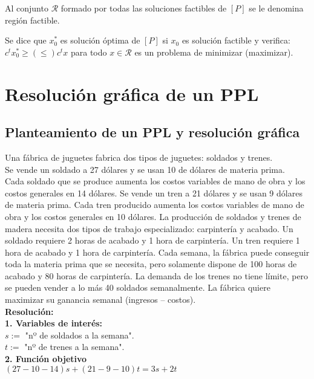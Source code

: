 \documentclass[11pt,fleqn]{book} %
\begin{document}
\begin{definition}
  Al conjunto $\mathcal{R}$ formado por todas las soluciones factibles de $[P]$ se le denomina región factible.
\end{definition}
\begin{definition}
  Se dice que $x_0^*$ es solución óptima de $[P]$ si $x_0$ es solución factible y verifica: \\
  $c^t x_0^* \geq (\leq) c^t x$ para todo $x \in \mathcal{R}$ es un problema de minimizar (maximizar).
\end{definition}
\section{Resolución gráfica de un PPL}
\subsection*{Planteamiento de un PPL y resolución gráfica}
Una fábrica de juguetes fabrica dos tipos de juguetes: soldados y trenes. \\
Se vende un soldado a 27 dólares y se usan 10 de dólares de materia prima. \\
Cada soldado que se produce aumenta los costos variables de mano de obra y los costos generales  en  14  dólares.  Se  vende  un  tren  a  21  dólares  y  se  usan  9  dólares  de materia prima. Cada  tren producido aumenta los costos variables de mano de obra y los costos generales en 10 dólares. La producción de soldados y trenes de madera necesita  dos  tipos  de  trabajo  especializado:  carpintería  y  acabado.  Un  soldado requiere  2  horas  de  acabado  y  1  hora  de  carpintería.  Un  tren  requiere  1  hora  de acabado  y  1  hora  de carpintería.  Cada  semana,  la  fábrica puede  conseguir  toda la materia prima que se necesita, pero solamente dispone de 100 horas de acabado y 80 horas de carpintería. La demanda de los trenes no tiene límite, pero se pueden vender  a  lo  más  40  soldados  semanalmente.  La  fábrica  quiere  maximizar  su ganancia semanal (ingresos – costos). \\
\textbf{Resolución: } \\
\textbf{1. Variables de interés: } \\
$s:=$ "nº de soldados a la semana". \\
$t:=$ "nº de trenes a la semana". \\
\textbf{2. Función objetivo} \\
$(27-10-14)s+(21-9-10)t=3s+2t$ \\
\end{document}
